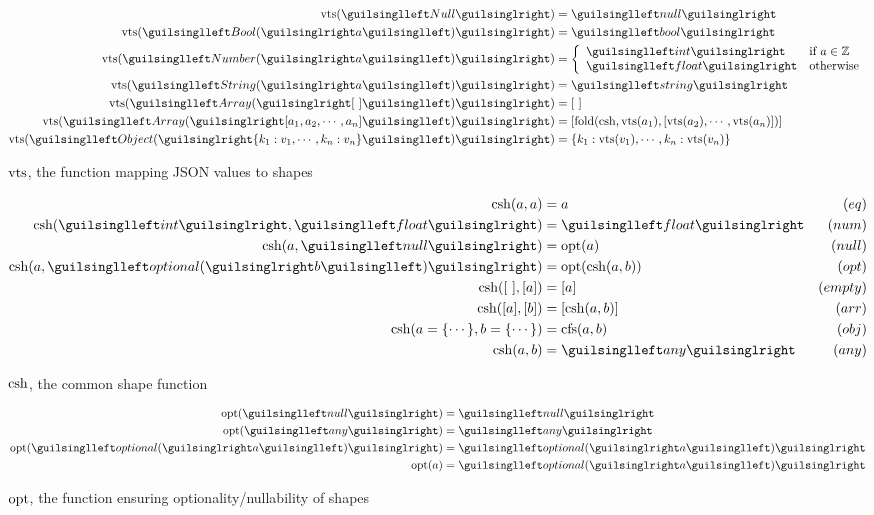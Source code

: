 \begin{figure}[ht!]
\begin{align*}
\shap(‹Null›)          &= ‹null› \\
\shap(‹Bool(›a‹)›)     &= ‹bool› \\
\shap(‹Number(›a‹)›)   &= \left\{\begin{array}{ll}
  ‹int›   & \text{if } a \in \mathbb{Z} \\
  ‹float› & \text{otherwise}
\end{array}\right.\\
\shap(‹String(›a‹)›)   &= ‹string› \\
\shap(‹Array(›[\ ]‹)›) &= [\ ] \\
\shap(‹Array(›[a_1, a_2, \cdots, a_n]‹)›) &= [\fold(\csh, \shap(a_1), [\shap(a_2), \cdots, \shap(a_n)])] \\
\shap(‹Object(›\{ k_1 : v_1, \cdots, k_n : v_n \}‹)›) &= \{ k_1 : \shap(v_1), \cdots, k_n : \shap(v_n) \}
\end{align*}
\caption{$\operatorname{vts}$, the function mapping JSON values to shapes}
\label{fig:shap}
\end{figure}

\begin{figure}[ht!]
\begin{align*}
\csh(a, a)               &=  a               & (eq) \\
\csh(‹int›, ‹float›)     &= ‹float›          & (num) \\
\csh(a, ‹null›)          &= \opt(a)          & (null) \\
\csh(a, ‹optional(›b‹)›) &= \opt(\csh(a, b)) & (opt) \\
\csh([\ ], [a])          &= [a]              & (empty) \\
\csh([a], [b])           &= [\csh(a, b)]     & (arr) \\
\csh(a = \{ \cdots \}, b = \{ \cdots \}) &= \cfs(a, b) & (obj) \\
\csh(a, b)               &= ‹any›            & (any)
\end{align*}
\caption{$\operatorname{csh}$, the common shape function}
\label{fig:csh}
\end{figure}

\begin{figure}[ht!]
\begin{align*}
\opt(‹null›) &= ‹null› \\
\opt(‹any›)  &= ‹any› \\
\opt(‹optional(›a‹)›) &= ‹optional(›a‹)› \\
\opt(a) &= ‹optional(›a‹)›
\end{align*}
\caption{$\operatorname{opt}$, the function ensuring optionality/nullability of shapes}
\label{fig:opt}
\end{figure}

